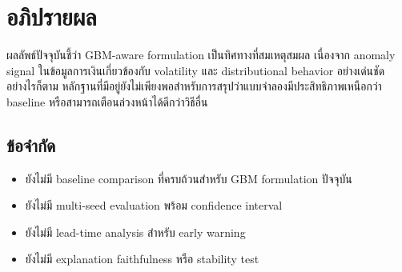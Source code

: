 \chapter{อภิปรายผล}

ผลลัพธ์ปัจจุบันชี้ว่า GBM-aware formulation เป็นทิศทางที่สมเหตุสมผล เนื่องจาก anomaly signal ในข้อมูลการเงินเกี่ยวข้องกับ volatility และ distributional behavior อย่างเด่นชัด อย่างไรก็ตาม หลักฐานที่มีอยู่ยังไม่เพียงพอสำหรับการสรุปว่าแบบจำลองมีประสิทธิภาพเหนือกว่า baseline หรือสามารถเตือนล่วงหน้าได้ดีกว่าวิธีอื่น

\section{ข้อจำกัด}

\begin{itemize}
  \item ยังไม่มี baseline comparison ที่ครบถ้วนสำหรับ GBM formulation ปัจจุบัน
  \item ยังไม่มี multi-seed evaluation พร้อม confidence interval
  \item ยังไม่มี lead-time analysis สำหรับ early warning
  \item ยังไม่มี explanation faithfulness หรือ stability test
\end{itemize}

